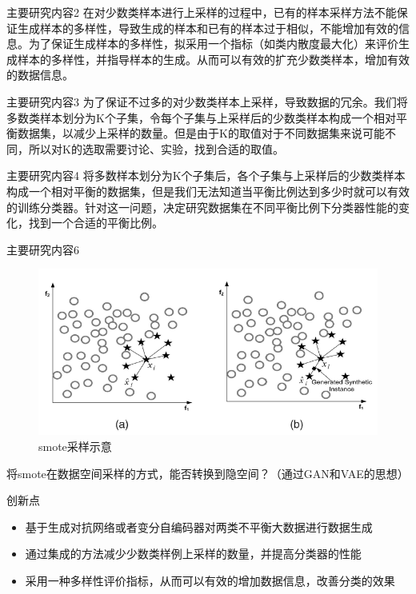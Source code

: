 \documentclass{beamer}
\begin{document}
\begin{frame}{主要研究内容2}\pause
    在对少数类样本进行上采样的过程中，已有的样本采样方法不能保证生成样本的多样性，导致生成的样本和已有的样本过于相似，不能增加有效的信息。为了保证生成样本的多样性，拟采用一个指标（如类内散度最大化）来评价生成样本的多样性，并指导样本的生成。从而可以有效的扩充少数类样本，增加有效的数据信息。
\end{frame}

\begin{frame}{主要研究内容3}\pause
    为了保证不过多的对少数类样本上采样，导致数据的冗余。我们将多数类样本划分为K个子集，令每个子集与上采样后的少数类样本构成一个相对平衡数据集，以减少上采样的数量。但是由于K的取值对于不同数据集来说可能不同，所以对K的选取需要讨论、实验，找到合适的取值。
\end{frame}

\begin{frame}{主要研究内容4}\pause
    将多数样本划分为K个子集后，各个子集与上采样后的少数类样本构成一个相对平衡的数据集，但是我们无法知道当平衡比例达到多少时就可以有效的训练分类器。针对这一问题，决定研究数据集在不同平衡比例下分类器性能的变化，找到一个合适的平衡比例。
\end{frame}

\begin{frame}{主要研究内容6}\pause
    \begin{figure}[t]
        \includegraphics[scale=0.25]{smote.png}
        \caption{smote采样示意}
    \end{figure}
    将smote在数据空间采样的方式，能否转换到隐空间？（通过GAN和VAE的思想）
\end{frame}

\begin{frame}{创新点}\pause
    \begin{itemize}
        \item 基于生成对抗网络或者变分自编码器对两类不平衡大数据进行数据生成
        \item 通过集成的方法减少少数类样例上采样的数量，并提高分类器的性能
        \item 采用一种多样性评价指标，从而可以有效的增加数据信息，改善分类的效果
    \end{itemize}
\end{frame}
\end{document}
